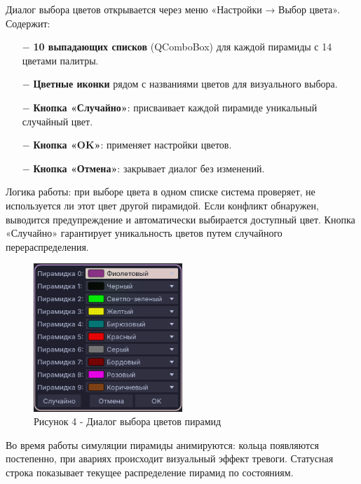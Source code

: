 \documentclass[oneside,a4paper,14pt]{extarticle}
\begin{document}
Диалог выбора цветов открывается через меню «Настройки → Выбор цвета». Содержит:

\begin{itemize}
  \item[$-$] \textbf{10 выпадающих списков} (QComboBox) для каждой пирамиды с 14 цветами палитры.
  \item[$-$] \textbf{Цветные иконки} рядом с названиями цветов для визуального выбора.
  \item[$-$] \textbf{Кнопка «Случайно»}: присваивает каждой пирамиде уникальный случайный цвет.
  \item[$-$] \textbf{Кнопка «OK»}: применяет настройки цветов.
  \item[$-$] \textbf{Кнопка «Отмена»}: закрывает диалог без изменений.
\end{itemize}

Логика работы: при выборе цвета в одном списке система проверяет, не используется ли этот цвет другой пирамидой. Если конфликт обнаружен, выводится предупреждение и автоматически выбирается доступный цвет. Кнопка «Случайно» гарантирует уникальность цветов путем случайного перераспределения.

\begin{figure}[H]
  \centering
  \includegraphics[width=0.5\textwidth]{pics/color_dialog.png}
  \caption*{Рисунок 4 - Диалог выбора цветов пирамид}
\end{figure}

\clearpage

Во время работы симуляции пирамиды анимируются: кольца появляются постепенно, при авариях происходит визуальный эффект тревоги. Статусная строка показывает текущее распределение пирамид по состояниям.
\end{document}
